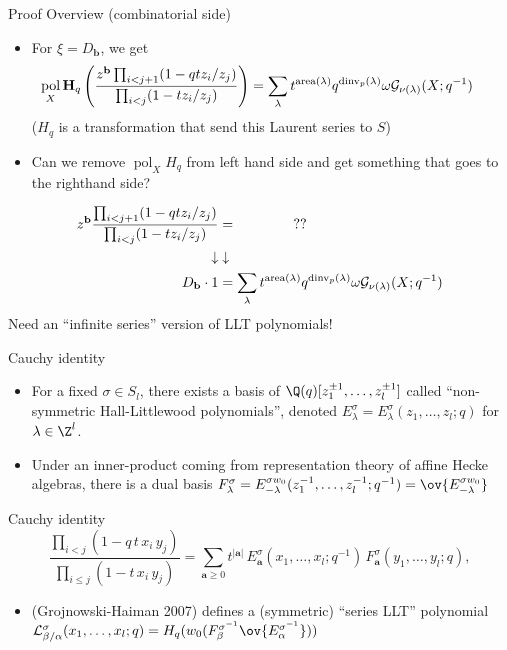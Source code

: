 \documentclass{beamer}
\DeclareMathOperator{\area}{area}
\DeclareMathOperator{\dinv}{dinv}
\newcommand{\Gcal}{\mathcal{G}}
\newcommand{\Lcal}{{\mathcal L}}
\newcommand{\Hbold}{{\mathbf H}}
\newcommand{\bb}{{\mathbf b}}
\newcommand{\aA}{{\mathbf a}}
\DeclareMathOperator{\pol}{pol}
\newcounter{c}
\begin{document}
\begin{frame}{Proof Overview (combinatorial side)}
  \begin{itemize}
  \item For \(\xi = D_\bb\), we get \[
      \hspace{-5ex} \pol_X \Hbold_q \left(\frac{z^{\bb} \prod_{i < j+1}
          (1-qt z_i/z_j)}{\prod_{i<j} (1 - t z_i/z_j)}  \right) = 
      \sum_{\lambda}
      t^{\area(\lambda)}
        q^{\dinv_p(\lambda)}\omega \Gcal_{\nu(\lambda)}(X;q^{-1})
      \]
      (\(H_q\) is a transformation that send this Laurent series to \(S\))
      \pause
  \item Can we remove \(\pol_X H_q\) from left hand side and get
    something that goes to the righthand side?
  \end{itemize}
      \begin{eqnarray*}
        z^{\bb} \frac{\prod_{i < j+1} (1-qt z_i/z_j)}{\prod_{i<j}(1-t
        z_i/z_j)} & =\hspace{10ex} ?? \hspace{10ex}\\
        \downarrow & \downarrow\\
       D_\bb \cdot 1 & = \sum_{\lambda}
      t^{\area(\lambda)}
        q^{\dinv_p(\lambda)}\omega \Gcal_{\nu(\lambda)}(X;q^{-1})
      \end{eqnarray*}\pause
      Need an ``infinite series'' version of LLT polynomials!
\end{frame}
\begin{frame}{Cauchy identity}
  \begin{itemize}
  \item For a fixed \(\sigma \in S_l\), there exists a basis of
    \(\Q(q)[z_1^{\pm 1},\ldots,z_l^{\pm 1}]\) called ``non-symmetric Hall-Littlewood
    polynomials'', denoted \(E_\lambda^{\sigma} = E_\lambda^{\sigma}(z_1,\ldots,z_l;q)\) for
    \(\lambda \in \Z^l\).\pause
  \item Under an inner-product coming from representation theory of
    affine Hecke algebras, there is a dual basis \(F_\lambda^{\sigma} =
    E^{\sigma w_0}_{-\lambda}(z_1^{-1},\ldots,z_l^{-1};q^{-1}) =
    \ov{E^{\sigma w_0}_{-\lambda}}\)\pause
  \end{itemize}
    \begin{block}{Cauchy identity}
      \[ \frac{\prod _{i<j} (1 - q\, t\, x_{i} \, y_{j})}{\prod
          _{i\leq j} (1 - t\, x_{i}\, y_{j})} = \sum _{\aA \geq 0}
        t^{|\aA |}\, E^{\sigma }_{\aA }(x_{1},\ldots,x_{l};q^{-1}) \,
        F^{\sigma }_{\aA }(y_{1},\ldots,y_{l};q),
      \]
    \end{block}\pause
    \begin{itemize}
    \item (Grojnowski-Haiman 2007) defines a (symmetric) ``series LLT'' polynomial
      \(\Lcal^\sigma_{\beta/\alpha}(x_1,\ldots,x_l;q) =
          H_q(w_0(F^{\sigma^{-1}}_\beta
          \ov{E^{\sigma^{-1}}_\alpha}))\)
    \end{itemize}
\end{frame}
\end{document}
